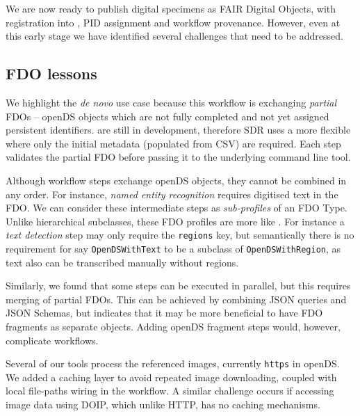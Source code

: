 We are now ready to publish digital specimens as FAIR Digital Objects,
with registration into , \acrshort{PID} assignment and workflow provenance. However, even at
this early stage we have identified several challenges that need to be
addressed.

\subsection{FDO lessons}\label{ch7:fdo-lessons}

We highlight the \emph{de novo} use case because this workflow is
exchanging \emph{partial} FDOs -- openDS objects which are not fully
completed and not yet assigned persistent identifiers.
 are still in
development, therefore SDR uses a
more flexible
 where only the initial metadata (populated from CSV) are
required. Each step validates the partial FDO before passing it to the
underlying command line tool.

Although workflow steps exchange openDS objects, they cannot be combined
in any order. For instance, \emph{named entity recognition} requires
digitised text in the FDO. We can consider these intermediate steps as
\emph{sub-profiles} of an FDO Type. Unlike hierarchical subclasses,
these FDO profiles are more like
. For
instance a \emph{text detection} step may only require the
\texttt{regions} key, but semantically there is no requirement for say
\texttt{OpenDSWithText} to be a subclass of \texttt{OpenDSWithRegion},
as text also can be transcribed manually without regions.

Similarly, we found that some steps can be executed in parallel, but
this requires merging of partial FDOs. This can be achieved by combining
\acrshort{JSON} queries and JSON Schemas, but indicates that it may be more
beneficial to have FDO fragments as separate objects. Adding openDS
fragment steps would, however, complicate workflows.

Several of our tools process the referenced images, currently \texttt{https} 
in openDS. We added a caching layer to avoid repeated image downloading,
coupled with local file-paths wiring in the workflow. A similar
challenge occurs if accessing image data using \acrshort{DOIP}, which unlike \acrshort{HTTP},
has no caching mechanisms.

